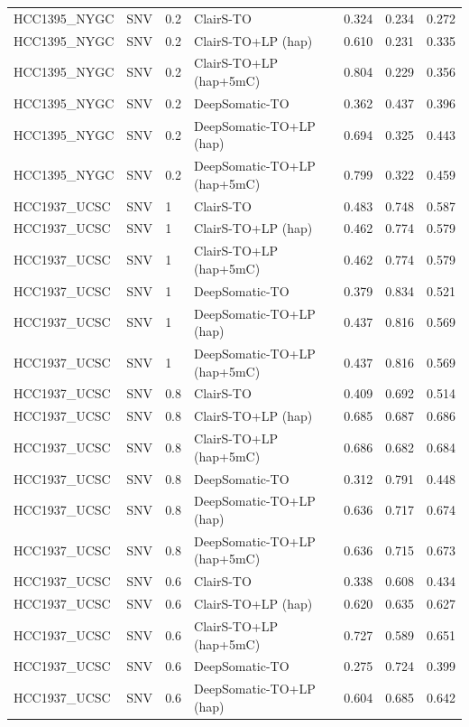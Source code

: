 \documentclass[pdflatex,sn-nature]{sn-jnl}
\begin{document}
{\begin{longtable}{@{}llllccc@{}}
  HCC1395\_NYGC & SNV & 0.2 & ClairS-TO & 0.324 & 0.234 & 0.272 \\
  HCC1395\_NYGC & SNV & 0.2 & ClairS-TO+LP (hap) & 0.610 & 0.231 & 0.335 \\
  HCC1395\_NYGC & SNV & 0.2 & ClairS-TO+LP (hap+5mC) & 0.804 & 0.229 & 0.356 \\
  HCC1395\_NYGC & SNV & 0.2 & DeepSomatic-TO & 0.362 & 0.437 & 0.396 \\
  HCC1395\_NYGC & SNV & 0.2 & DeepSomatic-TO+LP (hap) & 0.694 & 0.325 & 0.443 \\
  HCC1395\_NYGC & SNV & 0.2 & DeepSomatic-TO+LP (hap+5mC) & 0.799 & 0.322 & 0.459 \\
  HCC1937\_UCSC & SNV & 1 & ClairS-TO & 0.483 & 0.748 & 0.587 \\
  HCC1937\_UCSC & SNV & 1 & ClairS-TO+LP (hap) & 0.462 & 0.774 & 0.579 \\
  HCC1937\_UCSC & SNV & 1 & ClairS-TO+LP (hap+5mC) & 0.462 & 0.774 & 0.579 \\
  HCC1937\_UCSC & SNV & 1 & DeepSomatic-TO & 0.379 & 0.834 & 0.521 \\
  HCC1937\_UCSC & SNV & 1 & DeepSomatic-TO+LP (hap) & 0.437 & 0.816 & 0.569 \\
  HCC1937\_UCSC & SNV & 1 & DeepSomatic-TO+LP (hap+5mC) & 0.437 & 0.816 & 0.569 \\
  HCC1937\_UCSC & SNV & 0.8 & ClairS-TO & 0.409 & 0.692 & 0.514 \\
  HCC1937\_UCSC & SNV & 0.8 & ClairS-TO+LP (hap) & 0.685 & 0.687 & 0.686 \\
  HCC1937\_UCSC & SNV & 0.8 & ClairS-TO+LP (hap+5mC) & 0.686 & 0.682 & 0.684 \\
  HCC1937\_UCSC & SNV & 0.8 & DeepSomatic-TO & 0.312 & 0.791 & 0.448 \\
  HCC1937\_UCSC & SNV & 0.8 & DeepSomatic-TO+LP (hap) & 0.636 & 0.717 & 0.674 \\
  HCC1937\_UCSC & SNV & 0.8 & DeepSomatic-TO+LP (hap+5mC) & 0.636 & 0.715 & 0.673 \\
  HCC1937\_UCSC & SNV & 0.6 & ClairS-TO & 0.338 & 0.608 & 0.434 \\
  HCC1937\_UCSC & SNV & 0.6 & ClairS-TO+LP (hap) & 0.620 & 0.635 & 0.627 \\
  HCC1937\_UCSC & SNV & 0.6 & ClairS-TO+LP (hap+5mC) & 0.727 & 0.589 & 0.651 \\
  HCC1937\_UCSC & SNV & 0.6 & DeepSomatic-TO & 0.275 & 0.724 & 0.399 \\
  HCC1937\_UCSC & SNV & 0.6 & DeepSomatic-TO+LP (hap) & 0.604 & 0.685 & 0.642 \\

\end{longtable}}
\end{document}

